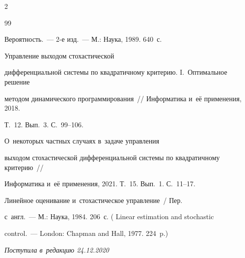 \begin{multicols}{2}
{{\begin{thebibliography}{99}


 Вероятность.~--- 2-е изд.~--- М.: Наука, 1989. 640~с.




 Управление выходом стохастической 


дифференциальной системы по квад\-ра\-тич\-но\-му критерию. I.~Оптимальное решение 


методом динамического программирования~// Информатика и~её применения, 2018. 


Т.~12. Вып.~3. С.~99--106.




 О~некоторых частных случаях в~задаче управления 


выходом стохастической дифференциальной системы по квадратичному критерию~// 


Информатика и~её применения, 2021. Т.~15. Вып.~1. С.~11--17.




 Линейное оценивание и~стохастическое управление~/ Пер. 


с~англ.~--- М.: Наука, 1984. 206~с. ( Linear estimation and stochastic 


control.~--- London: Chapman and Hall, 1977. 224~p.)





 \end{thebibliography}





}


}





\end{multicols}





\vspace*{-3pt}





\hfill{\small\textit{Поступила в~редакцию 24.12.2020}}





\vspace*{8pt}





